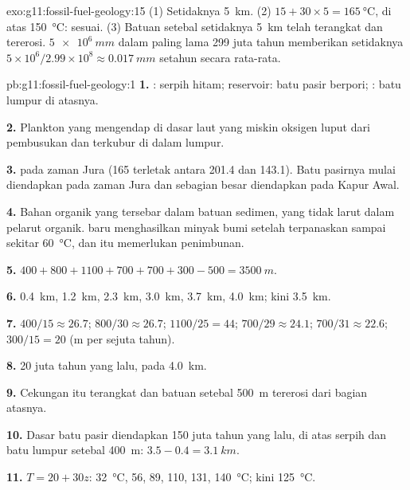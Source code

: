 \begin{solution}{exo:g11:fossil-fuel-geology:15}
(1) Setidaknya \qty{5}{km}. (2) $15 + 30 \times 5 = \qty{165}{\degreeCelsius}$,
di atas \qty{150}{\degreeCelsius}: sesuai. (3) Batuan setebal setidaknya
\qty{5}{km} telah terangkat dan tererosi. $\qty{5e6}{mm}$ dalam paling lama
\num{299} juta tahun memberikan setidaknya $5 \times 10^6/2.99 \times 10^8
\approx \qty{0.017}{mm}$ setahun secara rata-rata.
\end{solution}

\begin{solution}{pb:g11:fossil-fuel-geology:1}
\textbf{1.} : serpih hitam; reservoir: batu pasir berpori; : batu lumpur di atasnya.

\textbf{2.} Plankton yang mengendap di dasar laut yang miskin oksigen luput dari
pembusukan dan terkubur di dalam lumpur.

\textbf{3.}  pada zaman Jura (165 terletak antara 201.4 dan
143.1). Batu pasirnya mulai diendapkan pada zaman Jura dan sebagian besar
diendapkan pada Kapur Awal.

\textbf{4.} Bahan organik yang tersebar dalam batuan sedimen, yang tidak larut
dalam pelarut organik.  baru menghasilkan minyak bumi setelah
terpanaskan sampai sekitar \qty{60}{\degreeCelsius}, dan itu memerlukan
penimbunan.

\textbf{5.} $400 + 800 + 1100 + 700 + 700 + 300 - 500 = \qty{3500}{m}$.

\textbf{6.} \qty{0.4}{km}, \qty{1.2}{km}, \qty{2.3}{km}, \qty{3.0}{km},
\qty{3.7}{km}, \qty{4.0}{km}; kini \qty{3.5}{km}.

\textbf{7.} $400/15 \approx 26.7$; $800/30 \approx 26.7$; $1100/25 = 44$;
$700/29 \approx 24.1$; $700/31 \approx 22.6$; $300/15 = 20$ (\unit{m} per
sejuta tahun).

\textbf{8.} 20 juta tahun yang lalu, pada \qty{4.0}{km}.

\textbf{9.} Cekungan itu terangkat dan batuan setebal \qty{500}{m} tererosi
dari bagian atasnya.

\textbf{10.} Dasar batu pasir diendapkan 150 juta tahun yang lalu, di atas
serpih dan batu lumpur setebal \qty{400}{m}: $3.5 - 0.4 = \qty{3.1}{km}$.

\textbf{11.} $T = 20 + 30 z$: \qty{32}{\degreeCelsius}, \num{56}, \num{89},
\num{110}, \num{131}, \qty{140}{\degreeCelsius}; kini
\qty{125}{\degreeCelsius}.


\end{solution}
